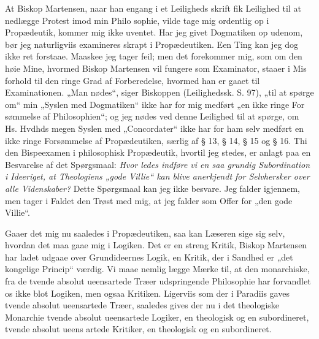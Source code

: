 \documentclass[12pt]{book}
\newcommand{\opage}[1]{\marginnote{\footnotesize\textit{[#1]}}}
\begin{document}
At Biskop Martensen, naar han engang i et Leiligheds\-%
skrift fik Leilighed til at nedlægge Protest imod min Philo\-%
sophie, vilde tage mig ordentlig op i Propædeutik, kommer
mig ikke uventet. Har jeg givet Dogmatiken op udenom,
bør jeg naturligviis examineres skrapt i Propædeutiken. Een
Ting kan jeg dog ikke ret forstaae. Maaskee jeg tager feil;
\opage{113}\setcounter{footnote}{0}%
men det forekommer mig, som om den høie Mine, hvormed
Biskop Martensen vil fungere som Examinator, staaer i Mis\-%
forhold til den ringe Grad af Forberedelse, hvormed han er
gaaet til Examinationen. „Man nødes“, siger Biskoppen
(Leilighedssk. S. 97), „til at spørge om“ min „Syslen med
Dogmatiken“ ikke har for mig medført „en ikke ringe For\-%
sømmelse af Philosophien“; og jeg nødes ved denne Leilighed til
at spørge, om Hs. Hvdhds megen Syslen med „Concordater“
ikke har for ham selv medført en ikke ringe Forsømmelse af
Propædeutiken, særlig af § 13, § 14, § 15 og § 16. Thi
den Bispeexamen i philosophisk Propædeutik, hvortil jeg stedes,
er anlagt paa en Besvarelse af det Spørgsmaal: \emph{Hvor\-%
ledes indføre vi en saa grundig Subordination i
Ideeriget, at Theologiens „gode Villie“ kan blive
anerkjendt for Selvhersker over alle Videnskaber?}
Dette Spørgsmaal kan jeg ikke besvare. Jeg falder igjennem,
men tager i Faldet den Trøst med mig, at jeg falder som
Offer for „den gode Villie“.%

Gaaer det mig nu saaledes i Propædeutiken, saa kan
Læseren sige sig selv, hvordan det maa gaae mig i Logiken.
Det er en streng Kritik, Biskop Martensen har ladet udgaae
over Grundideernes Logik, en Kritik, der i Sandhed er „det
kongelige Princip“ værdig. Vi maae nemlig lægge Mærke
til, at den monarchiske, fra de tvende absolut ueensartede
Træer udspringende Philosophie har forvandlet os ikke blot
Logiken, men ogsaa Kritiken. Ligerviis som der i Paradiis
gaves tvende absolut ueensartede Træer, saaledes gives der
nu i det theologiske Monarchie tvende absolut ueensartede
Logiker, en theologisk og en subordineret, tvende absolut ueens\-%
artede Kritiker, en theologisk og en subordineret.
\end{document}
